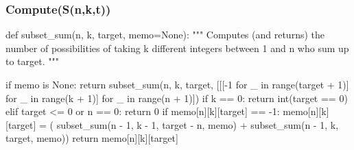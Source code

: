\documentclass[a4paper, english, 10pt]{article}
\begin{document}
\subsubsection{Compute(S(n,k,t))}
\begin{customFrame}
def subset_sum(n, k, target, memo=None):
	""" Computes (and returns) the number of possibilities of taking k different integers between 1 and n who sum up to target. """
	
	if memo is None:
		return subset_sum(n, k, target, [[[-1 for _ in range(target + 1)]
										for _ in range(k + 1)] for _ in range(n + 1)])
	if k == 0:
		return int(target == 0)
	elif target <= 0 or n == 0:
		return 0
	if memo[n][k][target] == -1:
		memo[n][k][target] = (
			subset_sum(n - 1, k - 1, target - n, memo) + 
			subset_sum(n - 1, k, target, memo))
	return memo[n][k][target]

\end{customFrame}
\end{document}
